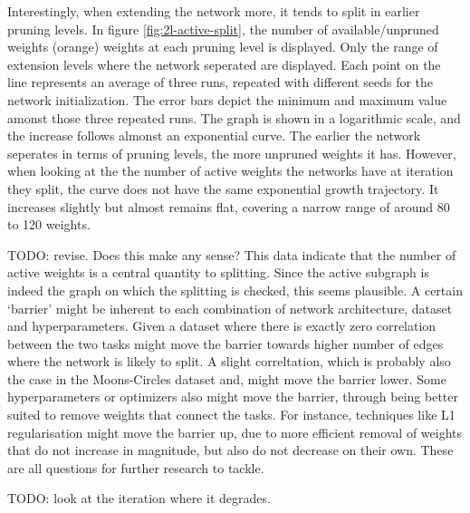 Interestingly, when extending the network more, it tends to split in earlier pruning levels.
In figure \ref{fig:2l-active-split}, the number of available/unpruned weights (orange) weights at each pruning level is displayed.
Only the range of extension levels where the network seperated are displayed.
Each point on the line represents an average of three runs, repeated with different seeds for the network initialization.
The error bars depict the minimum and maximum value amonst those three repeated runs.
The graph is shown in a logarithmic scale, and the increase follows almonst an exponential curve.
The earlier the network seperates in terms of pruning levels, the more unpruned weights it has.
However, when looking at the the number of active weights the networks have at iteration they split, the curve does not have the same exponential growth trajectory.
It increases slightly but almost remains flat, covering a narrow range of around 80 to 120 weights.

TODO: revise. Does this make any sense?
This data indicate that the number of active weights is a central quantity to splitting.
Since the active subgraph is indeed the graph on which the splitting is checked, this seems plausible.
A certain `barrier' might be inherent to each combination of network architecture, dataset and hyperparameters.
Given a dataset where there is exactly zero correlation between the two tasks might move the barrier towards higher number of edges where the network is likely to split.
A slight correltation, which is probably also the case in the Moons-Circles dataset and, might move the barrier lower.
Some hyperparameters or optimizers also might move the barrier, through being better suited to remove weights that connect the tasks.
For instance, techniques like L1 regularisation might move the barrier up, due to more efficient removal of weights that do not increase in magnitude, but also do not decrease on their own.
These are all questions for further research to tackle.
 
TODO: look at the iteration where it degrades.

